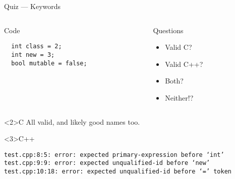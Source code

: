\documentclass[presentation,aspectratio=169]{beamer}
\begin{document}

\begin{frame}[fragile,label={sec:org23c4234}]{Quiz — Keywords}
\begin{columns}
\begin{column}{0.48\columnwidth}
\begin{block}{Code}
\begin{verbatim}
  int class = 2;
  int new = 3;
  bool mutable = false;
\end{verbatim}
\end{block}
\end{column}

\begin{column}{0.48\columnwidth}
\begin{block}{Questions}
\begin{itemize}
\item Valid C?
\item Valid C++?
\item Both?
\item Neither!?
\end{itemize}
\end{block}
\end{column}
\end{columns}

\begin{block}<2>{C}
All valid, and likely good names too.
\end{block}

\vspace{-1cm}
\begin{block}<3>{C++}
\begin{verbatim}
test.cpp:8:5: error: expected primary-expression before ‘int’
test.cpp:9:9: error: expected unqualified-id before ‘new’
test.cpp:10:18: error: expected unqualified-id before ‘=’ token
\end{verbatim}
\end{block}
\end{frame}

\end{document}
